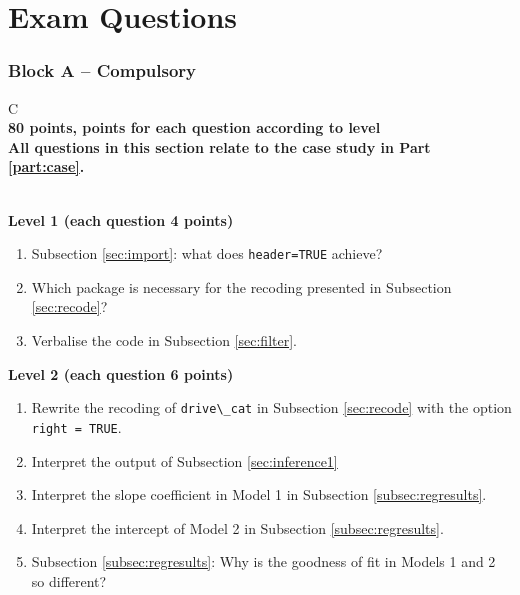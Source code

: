 \documentclass[12pt,a4paper]{article}
\makeatletter
\newcommand{\passthrough}[1]{#1}
\renewenvironment{table}[1][]{%
 \ifthenelse{\equal{#1}{}}{%
   \@float{table}
 }{%
   \@float{table}[#1]%
 }%
 \centering
}{%
 \end@float
}
\let\Oldlstinline\lstinline
\DeclareRobustCommand{\lstinline}[1][]{\Oldlstinline[style=InlineCode,#1]}
\providecommand{\tightlist}{%
  \setlength{\itemsep}{0pt}\setlength{\parskip}{0pt}}
\providecommand{\passthrough}[1]{#1}
\makeatother
\begin{document}
\part{Exam Questions} \label{part:questions}

\section{Block A -- Compulsory}\label{block-a-compulsory}

\begin{table}[!h]
\centering
\begin{tabularx}{\textwidth}{C}
\Xhline{3\arrayrulewidth}
\\[-1ex]
\textbf{80 points, points for each question according to level} \\
\addlinespace
\textbf{All questions in this section relate to the case study in Part \ref{part:case}.} \\
\\[-1ex]
\Xhline{3\arrayrulewidth}
\end{tabularx}
\end{table}

\vspace{1cm}

\textbf{Level 1 (each question 4 points)}

\begin{enumerate}
\def\labelenumi{\arabic{enumi}.}
\tightlist
\item
  Subsection \ref{sec:import}: what does
  \passthrough{\lstinline!header=TRUE!} achieve?
\item
  Which package is necessary for the recoding presented in Subsection
  \ref{sec:recode}?
\item
  Verbalise the code in Subsection \ref{sec:filter}.
\end{enumerate}

\textbf{Level 2 (each question 6 points)}

\begin{enumerate}
\def\labelenumi{\arabic{enumi}.}
\setcounter{enumi}{3}
\tightlist
\item
  Rewrite the recoding of \passthrough{\lstinline!drive\_cat!} in
  Subsection \ref{sec:recode} with the option
  \passthrough{\lstinline!right = TRUE!}.
\item
  Interpret the output of Subsection \ref{sec:inference1}
\item
  Interpret the slope coefficient in Model 1 in Subsection
  \ref{subsec:regresults}.
\item
  Interpret the intercept of Model 2 in Subsection
  \ref{subsec:regresults}.
\item
  Subsection \ref{subsec:regresults}: Why is the goodness of fit in
  Models 1 and 2 so different?
\end{enumerate}
\end{document}
